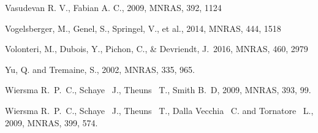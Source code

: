 \documentclass[a4paper,fleqn,usenatbib,letter]{mnras}
\begin{document}
\begin{thebibliography}{99}
 





Vasudevan R. V., Fabian A. C., 2009, MNRAS, 392, 1124

Vogelsberger, M., Genel, S., Springel, V., et al., 2014, MNRAS, 444, 1518

Volonteri, M., Dubois, Y., Pichon, C., \& Devriendt, J.\ 2016, MNRAS, 460, 2979


{Yu}, Q. and {Tremaine}, S., 2002, MNRAS, 335, 965.



Wiersma R.~P.~C., Schaye ~J., Theuns ~T., Smith B.~D,
2009,  MNRAS, 393, 99.

Wiersma R.~P.~C., Schaye ~J., Theuns ~T., Dalla Vecchia ~C. and Tornatore ~L.,
2009,  MNRAS, 399, 574.


\end{thebibliography}






\end{document}
